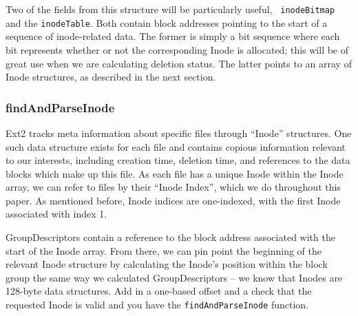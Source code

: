 \documentclass[nocopyrightspace]{sigplanconf}
\begin{document}
Two of the fields from this structure will be particularly useful, {\tt
inodeBitmap} and the {\tt inodeTable}. Both contain block addresses pointing
to the start of a sequence of inode-related data. The former is simply a bit
sequence where each bit represents whether or not the corresponding Inode is
allocated; this will be of great use when we are calculating deletion status.
The latter points to an array of Inode structures, as described in the next
section.

\subsubsection{findAndParseInode}

Ext2 tracks meta information about specific files through ``Inode''
structures. One such data structure exists for each file and contains copious
information relevant to our interests, including creation time, deletion time,
and references to the data blocks which make up this file. As each file has a
unique Inode within the Inode array, we can refer to files by their ``Inode
Index'', which we do throughout this paper. As mentioned before, Inode indices
are one-indexed, with the first Inode associated with index 1.

GroupDescriptors contain a reference to the block address associated with the
start of the Inode array. From there, we can pin point the beginning of the
relevant Inode structure by calculating the Inode's position within the block
group the same way we calculated GroupDescriptors -- we know that Inodes are
128-byte data structures.  Add in a one-based offset and a check that the
requested Inode is valid and you have the {\tt findAndParseInode} function.
\end{document}
